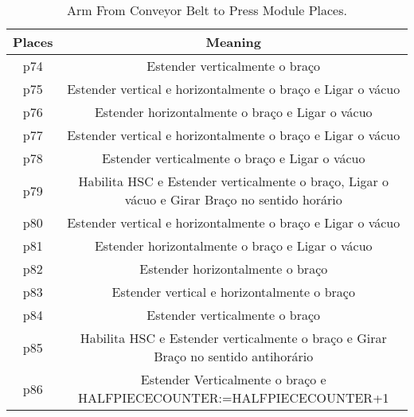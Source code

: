 \begin{table}[htbp]
\caption{Arm From Conveyor Belt to Press Module Places.}
\centering
\begin{tabular}{cc}
Places & Meaning\\
\hline
p74 & Estender verticalmente o braço\\
p75 & Estender vertical e horizontalmente o braço e Ligar o vácuo\\
p76 & Estender horizontalmente o braço e Ligar o vácuo\\
p77 & Estender vertical e horizontalmente o braço e Ligar o vácuo\\
p78 & Estender verticalmente o braço e Ligar o vácuo\\
p79 & Habilita HSC e Estender verticalmente o braço, Ligar o vácuo e Girar Braço no sentido horário\\
p80 & Estender vertical e horizontalmente o braço e Ligar o vácuo\\
p81 & Estender horizontalmente o braço e Ligar o vácuo\\
p82 & Estender horizontalmente o braço\\
p83 & Estender vertical e horizontalmente o braço\\
p84 & Estender verticalmente o braço\\
p85 & Habilita HSC e Estender verticalmente o braço e Girar Braço no sentido antihorário\\
p86 & Estender Verticalmente o braço e HALFPIECECOUNTER:=HALFPIECECOUNTER+1\\
\end{tabular}
\end{table}

